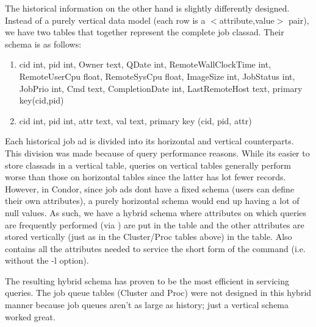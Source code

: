 The historical information on the other hand is slightly differently
designed.  Instead of a purely vertical data model (each row is a
$<$attribute,value$>$ pair), we have two tables that together represent the
complete job classad.  Their schema is as follows:

\begin{enumerate}

\item {}
        {cid                  int,
        pid                  int,
        Owner                text,
        QDate                int,
        RemoteWallClockTime  int,
        RemoteUserCpu        float,
        RemoteSysCpu         float,
        ImageSize            int,
        JobStatus            int,
        JobPrio              int,
        Cmd                  text,
        CompletionDate       int,
        LastRemoteHost       text,
        primary key(cid,pid)}

\item {}
	{cid int, pid int, attr text, val text, primary key
	(cid, pid, attr)}

\end{enumerate}

Each historical job ad is divided into its horizontal and vertical
counterparts.  This division was made because of query performance
reasons.  While its easier to store classads in a vertical table,
queries on vertical tables generally perform worse than those on
horizontal tables since the latter has lot fewer records.  However, in
Condor, since job ads dont have a fixed schema (users can define their
own attributes), a purely horizontal schema would end up having a lot
of null values. As such, we have a hybrid schema where attributes on
which queries are frequently performed (via ) are put
in the  table and the other attributes
are stored vertically (just as in the Cluster/Proc tables above) in the
 table. Also 
contains all the attributes needed to service the short form of the
 command (i.e. without the -l option).

The resulting hybrid schema has proven to be the most efficient in
servicing  queries.  The job queue tables (Cluster and
Proc) were not designed in this hybrid manner because job queues aren't
as large as history; just a vertical schema worked great.


